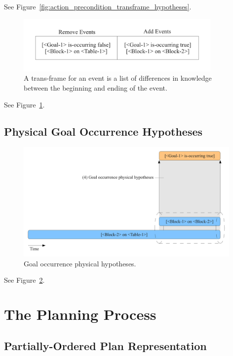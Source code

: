 See Figure~\ref{fig:action_precondition_transframe_hypotheses}.

\begin{figure}[bth]
  \center
  \includegraphics[width=10cm]{gfx/transframe}
  \caption[A trans-frame for an event]{A trans-frame for an event is a
    list of differences in knowledge between the beginning and ending
    of the event.}
  \label{fig:transframe}
\end{figure}

See Figure~\ref{fig:transframe}.



\subsection{Physical Goal Occurrence Hypotheses}

\begin{figure}[bth]
  \center
  \includegraphics[width=11cm]{gfx/learning_to_plan-4-goal_occurrence_physical_hypotheses}
  \caption[Goal occurrence physical hypotheses]{Goal occurrence physical hypotheses.}
  \label{fig:goal_occurrence_physical_hypotheses}
\end{figure}

See Figure~\ref{fig:goal_occurrence_physical_hypotheses}.



\section{The Planning Process}



\subsection{Partially-Ordered Plan Representation}

